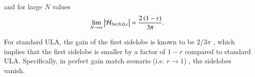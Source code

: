 and for large $N$ values 
\begin{equation*}
    \lim_{N\rightarrow\infty}\abs{\Hr_{3\pi/N,0,r}\omegaB}=\frac{
    2\rBrace{1-r}
    }{
    3\pi
    }.
\end{equation*}
\ifdefined\showDev
\else
\fi
\par For standard ULA, the gain of the first sidelobe is known to be $2/3\pi$ \cite{van2004optimum}, which implies that the first sidelobe is smaller by a factor of $1-r$ compared to standard ULA.
Specifically, in perfect gain match scenario (i.e. $r\to{}1$) , the sidelobes vanish. 
